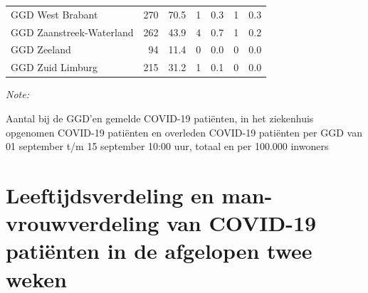 \documentclass[
  english,
  man,floatsintext]{apa6}
\begin{document}
\begin{table}[H]
\begin{threeparttable}
\begin{tabular}{lrrrrrr}
GGD West Brabant & 270 & 70.5 & 1 & 0.3 & 1 & 0.3\\
GGD Zaanstreek-Waterland & 262 & 43.9 & 4 & 0.7 & 1 & 0.2\\
GGD Zeeland & 94 & 11.4 & 0 & 0.0 & 0 & 0.0\\
GGD Zuid Limburg & 215 & 31.2 & 1 & 0.1 & 0 & 0.0\\
\bottomrule
\end{tabular}
\begin{tablenotes}
\item \textit{Note: } 
\item Aantal bij de GGD’en gemelde COVID-19 patiënten, in het ziekenhuis opgenomen COVID-19 patiënten en overleden COVID-19 patiënten per GGD van 01 september t/m 15 september 10:00 uur, totaal en per 100.000 inwoners
\end{tablenotes}
\end{threeparttable}
\endgroup{}
\end{table}

\newpage

\hypertarget{leeftijdsverdeling-en-man-vrouwverdeling-van-covid-19-patiuxebnten-in-de-afgelopen-twee-weken}{%
\section{Leeftijdsverdeling en man-vrouwverdeling van COVID-19 patiënten in de afgelopen twee weken}\label{leeftijdsverdeling-en-man-vrouwverdeling-van-covid-19-patiuxebnten-in-de-afgelopen-twee-weken}}
\end{document}
